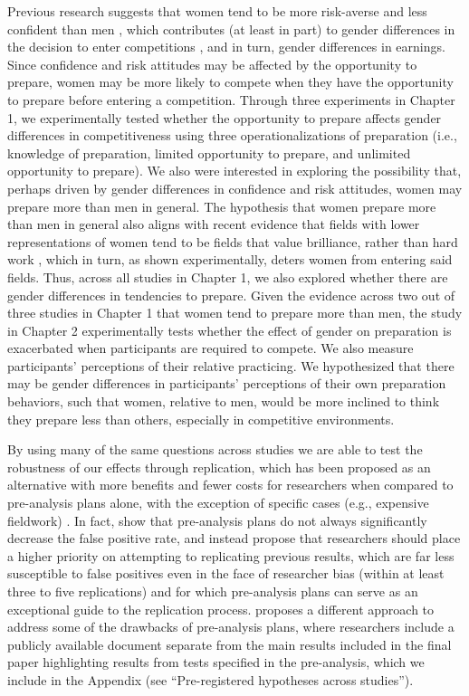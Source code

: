 \documentclass[a4paper, nobind]{templates/ociamthesis}
\begin{document}
Previous research suggests that women tend to be more risk-averse \autocite{Croson2009,Dohmen2011b,Eckel2008,Bertrand2010a} and less confident than men \autocite{Bertrand2010,Lundeberg1994,Mobius2011,Barber2001,Croson2009}, which contributes (at least in part) to gender differences in the decision to enter competitions \autocite{Veldhuizen2017,Gillen2019,Niederle2011}, and in turn, gender differences in earnings. Since confidence and risk attitudes may be affected by the opportunity to prepare, women may be more likely to compete when they have the opportunity to prepare before entering a competition. Through three experiments in Chapter 1, we experimentally tested whether the opportunity to prepare affects gender differences in competitiveness using three operationalizations of preparation (i.e., knowledge of preparation, limited opportunity to prepare, and unlimited opportunity to prepare). We also were interested in exploring the possibility that, perhaps driven by gender differences in confidence and risk attitudes, women may prepare more than men in general. The hypothesis that women prepare more than men in general also aligns with recent evidence that fields with lower representations of women tend to be fields that value brilliance, rather than hard work \autocite{Bian2017a,Bian2017,Leslie2015,Meyer2015}, which in turn, as shown experimentally, deters women from entering said fields. Thus, across all studies in Chapter 1, we also explored whether there are gender differences in tendencies to prepare. Given the evidence across two out of three studies in Chapter 1 that women tend to prepare more than men, the study in Chapter 2 experimentally tests whether the effect of gender on preparation is exacerbated when participants are required to compete. We also measure participants' perceptions of their relative practicing. We hypothesized that there may be gender differences in participants' perceptions of their own preparation behaviors, such that women, relative to men, would be more inclined to think they prepare less than others, especially in competitive environments.

By using many of the same questions across studies we are able to test the robustness of our effects through replication, which has been proposed as an alternative with more benefits and fewer costs for researchers when compared to pre-analysis plans alone, with the exception of specific cases (e.g., expensive fieldwork) \autocite{Coffman2015}. In fact, \textcite{Coffman2015} show that pre-analysis plans do not always significantly decrease the false positive rate, and instead propose that researchers should place a higher priority on attempting to replicating previous results, which are far less susceptible to false positives even in the face of researcher bias (within at least three to five replications) and for which pre-analysis plans can serve as an exceptional guide to the replication process. \textcite{Banerjee2020} proposes a different approach to address some of the drawbacks of pre-analysis plans, where researchers include a publicly available document separate from the main results included in the final paper highlighting results from tests specified in the pre-analysis, which we include in the Appendix (see ``Pre-registered hypotheses across studies'').
\end{document}
